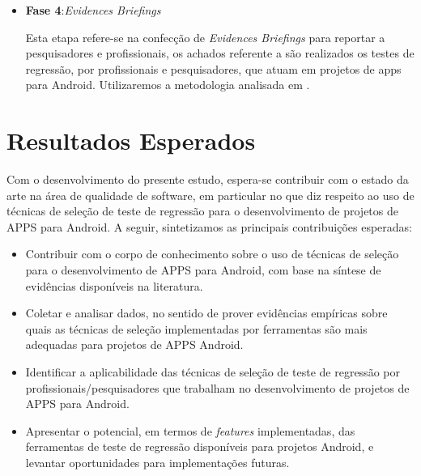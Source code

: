 \begin{itemize}
  \item \textbf{Fase 4}:\textit{Evidences Briefings}
  
  Esta etapa refere-se na confecção de \textit{Evidences Briefings} para reportar a pesquisadores e profissionais, os achados referente a são realizados os testes de regressão, por profissionais e pesquisadores, que atuam em projetos de apps para Android. Utilizaremos a metodologia analisada em .
  
\end{itemize}

\section{Resultados Esperados}\label{sec:resultadosesperados}


Com o desenvolvimento do presente estudo, espera-se contribuir com o estado da arte na área de qualidade de software, em particular no que diz respeito ao uso de técnicas de seleção de teste de regressão para o desenvolvimento de projetos de \ac{APPS} para Android. A seguir, sintetizamos as principais contribuições esperadas: 


\begin{itemize}

    \item Contribuir com o corpo de conhecimento sobre o uso de técnicas de seleção para o desenvolvimento de \ac{APPS} para Android, com base na síntese de evidências disponíveis na literatura.
    
    \item Coletar e analisar dados, no sentido de prover evidências empíricas sobre quais as técnicas de seleção implementadas por ferramentas são mais adequadas para projetos de \ac{APPS} Android.
    
    \item Identificar a aplicabilidade das técnicas de seleção de teste de regressão por profissionais/pesquisadores que trabalham no desenvolvimento de projetos de \ac{APPS} para Android.
    
    \item Apresentar o potencial, em termos de \textit{features} implementadas, das ferramentas de teste de regressão disponíveis para projetos Android, e levantar oportunidades para implementações futuras.

\end{itemize}


